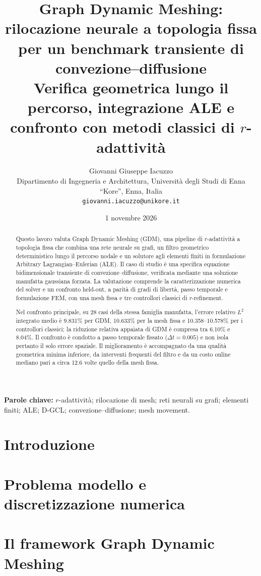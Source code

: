 \documentclass[10pt,a4paper,twocolumn]{article}
\title{\bfseries Graph Dynamic Meshing: rilocazione neurale a topologia fissa per un benchmark transiente di convezione--diffusione\\[0.35em]
\large Verifica geometrica lungo il percorso, integrazione ALE e confronto con metodi classici di $r$-adattività}
\author{Giovanni Giuseppe Iacuzzo\\
\small Dipartimento di Ingegneria e Architettura, Università degli Studi di Enna ``Kore'', Enna, Italia\\
\small \texttt{giovanni.iacuzzo@unikore.it}}
\date{1 novembre 2026}
\begin{document}
\maketitle

\begin{abstract}
Questo lavoro valuta Graph Dynamic Meshing (GDM), una pipeline di $r$-adattività a topologia fissa che combina una rete neurale su grafi, un filtro geometrico deterministico lungo il percorso nodale e un solutore agli elementi finiti in formulazione Arbitrary Lagrangian--Eulerian (ALE). Il caso di studio è una specifica equazione bidimensionale transiente di convezione--diffusione, verificata mediante una soluzione manufatta gaussiana forzata. La valutazione comprende la caratterizzazione numerica del solver e un confronto held-out, a parità di gradi di libertà, passo temporale e formulazione FEM, con una mesh fissa e tre controllori classici di $r$-refinement.

Nel confronto principale, su 28 casi della stessa famiglia manufatta, l'errore relativo $L^2$ integrato medio è 9.831\% per GDM, 10.633\% per la mesh fissa e 10.358--10.578\% per i controllori classici; la riduzione relativa appaiata di GDM è compresa tra 6.10\% e 8.04\%. Il confronto è condotto a passo temporale fissato ($\Delta t=0.005$) e non isola pertanto il solo errore spaziale. Il miglioramento è accompagnato da una qualità geometrica minima inferiore, da interventi frequenti del filtro e da un costo online mediano pari a circa 12.6 volte quello della mesh fissa.
\end{abstract}

\noindent\textbf{Parole chiave:} $r$-adattività; rilocazione di mesh; reti neurali su grafi; elementi finiti; ALE; D-GCL; convezione--diffusione; mesh movement.

\section{Introduzione}\label{sec:introduzione}


\section{Problema modello e discretizzazione numerica}\label{sec:problema}


\section{Il framework Graph Dynamic Meshing}\label{sec:framework}

\end{document}
